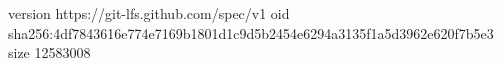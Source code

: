 version https://git-lfs.github.com/spec/v1
oid sha256:4df7843616e774e7169b1801d1c9d5b2454e6294a3135f1a5d3962e620f7b5e3
size 12583008
